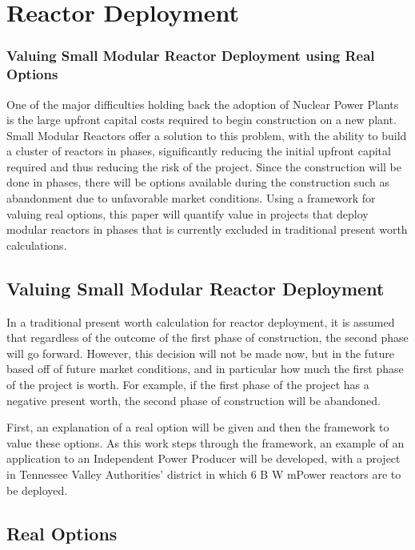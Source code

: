 

\section{Reactor Deployment}
 
\subsubsection{Valuing Small Modular Reactor Deployment using Real Options}

One of the major difficulties holding back the adoption of Nuclear Power Plants is the large upfront capital costs required to begin construction on a new plant.  Small Modular Reactors offer a solution to this problem, with the ability to build a cluster of reactors in phases, significantly reducing the initial upfront capital required and thus reducing the risk of the project.  Since the construction will be done in phases, there will be options available during the construction such as abandonment due to unfavorable market conditions.  Using a framework for valuing real options, this paper will quantify value in projects that deploy modular reactors in phases that is currently excluded in traditional present worth calculations.     

\subsection{Valuing Small Modular Reactor Deployment}

In a traditional present worth calculation for reactor deployment, it is assumed that regardless of the outcome of the first phase of construction, the second phase will go forward.  However, this decision will not be made now, but in the future based off of future market conditions, and in particular how much the first phase of the project is worth.  For example, if the first phase of the project has a negative present worth, the second phase of construction will be abandoned.

First, an explanation of a real option will be given and then the framework to value these options.  As this work steps through the framework, an example of an application to an Independent Power Producer will be developed, with a project in Tennessee Valley Authorities’ district in which 6 B W mPower reactors are to be deployed.      

\subsection{Real Options}

